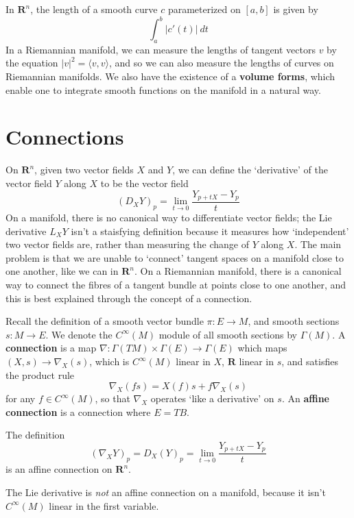 In $\mathbf{R}^n$, the length of a smooth curve $c$ parameterized on $[a,b]$ is given by
%
\[ \int_a^b |c'(t)|\ dt \]
%
In a Riemannian manifold, we can measure the lengths of tangent vectors $v$ by the equation $|v|^2 = \langle v, v \rangle$, and so we can also measure the lengths of curves on Riemannian manifolds. We also have the existence of a {\bf volume forms}, which enable one to integrate smooth functions on the manifold in a natural way.

\section{Connections}

On $\mathbf{R}^n$, given two vector fields $X$ and $Y$, we can define the `derivative' of the vector field $Y$ along $X$ to be the vector field
%
\[ (D_X Y)_p = \lim_{t \to 0} \frac{Y_{p + tX} - Y_p}{t} \]
%
On a manifold, there is no canonical way to differentiate vector fields; the Lie derivative $L_XY$ isn't a staisfying definition because it measures how `independent' two vector fields are, rather than measuring the change of $Y$ along $X$. The main problem is that we are unable to `connect' tangent spaces on a manifold close to one another, like we can in $\mathbf{R}^n$. On a Riemannian manifold, there is a canonical way to connect the fibres of a tangent bundle at points close to one another, and this is best explained through the concept of a connection.

Recall the definition of a smooth vector bundle $\pi: E \to M$, and smooth sections $s: M \to E$. We denote the $C^\infty(M)$ module of all smooth sections by $\Gamma(M)$. A {\bf connection} is a map $\nabla: \Gamma(TM) \times \Gamma(E) \to \Gamma(E)$ which maps $(X,s) \to \nabla_X(s)$, which is $C^\infty(M)$ linear in $X$, $\mathbf{R}$ linear in $s$, and satisfies the product rule
%
\[ \nabla_X(fs) = X(f)s + f\nabla_X(s) \]
%
for any $f \in C^\infty(M)$, so that $\nabla_X$ operates `like a derivative' on $s$. An {\bf affine connection} is a connection where $E = TB$.

\begin{example}
    The definition
    \[ (\nabla_X Y)_p = D_X(Y)_p = \lim_{t \to 0} \frac{Y_{p + tX} - Y_p}{t} \]
    is an affine connection on $\mathbf{R}^n$.
\end{example}

\begin{example}
    The Lie derivative is {\it not} an affine connection on a manifold, because it isn't $C^\infty(M)$ linear in the first variable.
\end{example}

